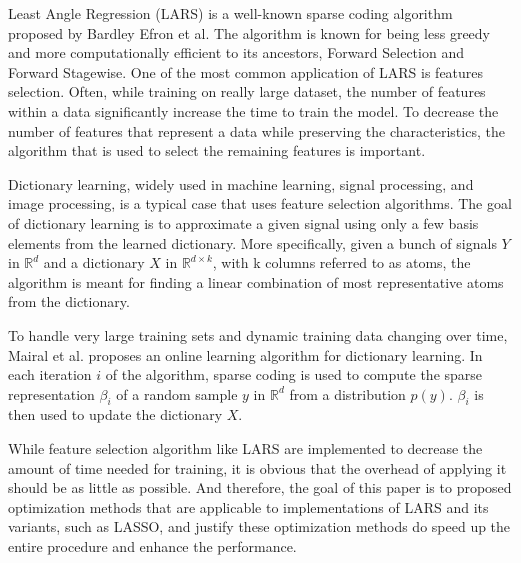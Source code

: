 


Least Angle Regression (LARS) is a well-known sparse coding algorithm proposed by Bardley Efron et al\cite{Efron:04}. The algorithm is known for being less greedy and more computationally efficient to its ancestors, Forward Selection and Forward Stagewise.
One of the most common application of LARS is features selection.
Often, while training on really large dataset, the number of features within a data significantly increase the time to train the model. To decrease the number of features that represent a data while preserving the characteristics, the algorithm that is used to select the remaining features is important.

Dictionary learning, widely used in machine learning, signal processing, and image processing, is a typical case that uses feature selection algorithms.
The goal of dictionary learning is to approximate a given signal using only a few basis elements from the learned dictionary. More specifically, given a bunch of signals $Y$ in $\mathbb{R}^d$ and a dictionary $X$ in $\mathbb{R}^{d \times k}$, with k columns referred to as atoms, the algorithm is meant for finding a linear combination of most representative atoms from the dictionary.

To handle very large training sets and dynamic training data changing over time, Mairal et al. proposes an online learning algorithm for dictionary learning\cite{Mairal:2010}. In each iteration $i$ of the algorithm, sparse coding is used to compute the sparse representation $\beta_i$ of a random sample $y$ in $\mathbb{R}^d$ from a distribution $p(y)$. $\beta_i$ is then used to update the dictionary $X$.

While feature selection algorithm like LARS are implemented to decrease the amount of time needed for training, it is obvious that the overhead of applying it should be as little as possible.
And therefore, the goal of this paper is to proposed optimization methods that are applicable to implementations of LARS and its variants, such as LASSO, and justify these optimization methods do speed up the entire procedure and enhance the performance.

